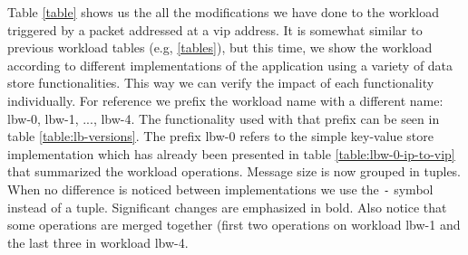 \begin{figure}[ht]
\begin{floatrow}
\end{floatrow}
\end{figure}

Table \ref{table} shows us the all the modifications we have done to
the workload triggered by a packet addressed at a \gls{vip}
address. It is somewhat similar to previous workload tables (e.g,
\ref{tables}), but this time, we show the workload according to
different implementations of the application using a variety of data
store functionalities. This way we can verify the impact of each
functionality individually. For reference we prefix the workload name
with a different name: lbw-0, lbw-1, ..., lbw-4. The functionality
used with that prefix can be seen in table
\ref{table:lb-versions}. The prefix lbw-0 refers to the simple
key-value store implementation which has already been presented in
table \ref{table:lbw-0-ip-to-vip} that summarized  the workload 
operations. Message size is now grouped in tuples. When no difference is noticed between implementations we use the \texttt{-}
symbol instead of a tuple. Significant changes are emphasized in
bold. Also notice that some operations are merged together (first
two operations on workload lbw-1 and the last three in workload
lbw-4.

